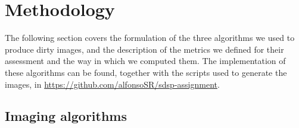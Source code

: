 \documentclass[11pt]{article}
\begin{document}






\section{Methodology}
\label{s:methods}

The following section covers the formulation of the three algorithms we used to produce dirty images, and the description of the metrics we defined for their assessment and the way in which we computed them.
The implementation of these algorithms can be found, together with the scripts used to generate the images, in \href{https://github.com/alfonsoSR/sdsp-assignment}{https://github.com/alfonsoSR/sdsp-assignment}.

\subsection{Imaging algorithms}
\label{ss:methods:algorithms}
\end{document}
